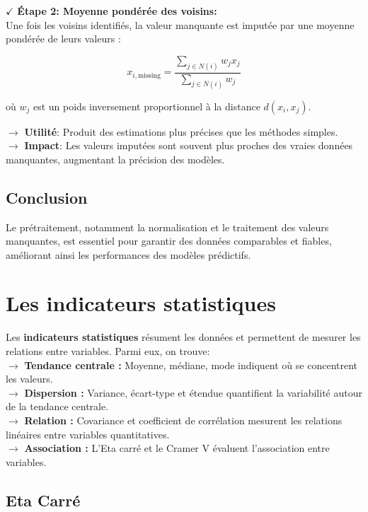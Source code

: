 \textbf{\(\checkmark\)} \textbf{Étape 2: Moyenne pondérée des voisins:} \\
Une fois les voisins identifiés, la valeur manquante est imputée par une moyenne pondérée de leurs valeurs :

\[
x_{i,\text{missing}} = \frac{\sum_{j \in N(i)} w_j x_j}{\sum_{j \in N(i)} w_j}
\]

où \(w_j\) est un poids inversement proportionnel à la distance \(d(x_i, x_j)\).

\noindent \textbf{\(\rightarrow\)} \textbf{Utilité}: Produit des estimations plus précises que les méthodes simples.\\
\textbf{\(\rightarrow\)} \textbf{Impact}: Les valeurs imputées sont souvent plus proches des vraies données manquantes, augmentant la précision des modèles.

\subsection{Conclusion}

Le prétraitement, notamment la normalisation et le traitement des valeurs manquantes, est essentiel pour garantir des données comparables et fiables, améliorant ainsi les performances des modèles prédictifs.

\section{Les indicateurs statistiques}

Les \textbf{indicateurs statistiques} résument les données et permettent de mesurer les relations entre variables. Parmi eux, on trouve:\\

\noindent  \textbf{\(\rightarrow\)} \textbf{Tendance centrale :} Moyenne, médiane, mode indiquent où se concentrent les valeurs.\\
\textbf{\(\rightarrow\)} \textbf{Dispersion :} Variance, écart-type et étendue quantifient la variabilité autour de la tendance centrale.\\
\textbf{\(\rightarrow\)} \textbf{Relation :} Covariance et coefficient de corrélation mesurent les relations linéaires entre variables quantitatives.\\
\textbf{\(\rightarrow\)} \textbf{Association :} L’Eta carré et le Cramer V évaluent l’association entre variables.

\subsection{Eta Carré}

